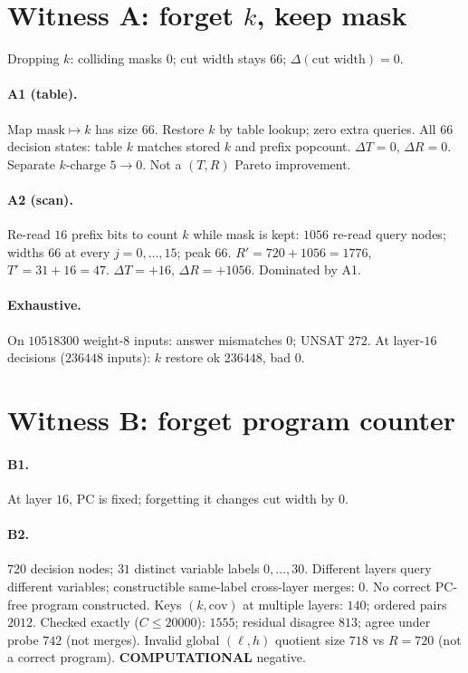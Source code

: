 \documentclass[11pt]{article}
\begin{document}
\section{Witness A: forget \(k\), keep mask}
Dropping \(k\): colliding masks \(0\); cut width stays \(66\); \(\Delta(\text{cut width})=0\).

\paragraph{A1 (table).}
Map \(\mathrm{mask}\mapsto k\) has size \(66\). Restore \(k\) by table lookup; zero extra queries.
All \(66\) decision states: table \(k\) matches stored \(k\) and prefix popcount.
\(\Delta T=0\), \(\Delta R=0\). Separate \(k\)-charge \(5\to 0\). Not a \((T,R)\) Pareto improvement.

\paragraph{A2 (scan).}
Re-read \(16\) prefix bits to count \(k\) while mask is kept: \(1056\) re-read query nodes;
widths \(66\) at every \(j=0,\ldots,15\); peak \(66\).
\(R'=720+1056=1776\), \(T'=31+16=47\). \(\Delta T=+16\), \(\Delta R=+1056\). Dominated by A1.

\paragraph{Exhaustive.}
On \(10518300\) weight-\(8\) inputs: answer mismatches \(0\); UNSAT \(272\).
At layer-\(16\) decisions (\(236448\) inputs): \(k\) restore ok \(236448\), bad \(0\).

\section{Witness B: forget program counter}
\paragraph{B1.} At layer \(16\), PC is fixed; forgetting it changes cut width by \(0\).

\paragraph{B2.} \(720\) decision nodes; \(31\) distinct variable labels \(0,\ldots,30\).
Different layers query different variables; constructible same-label cross-layer merges: \(0\).
No correct PC-free program constructed.
Keys \((k,\mathrm{cov})\) at multiple layers: \(140\); ordered pairs \(2012\).
Checked exactly (\(C\le 20000\)): \(1555\); residual disagree \(813\); agree under probe \(742\) (not merges).
Invalid global \((\ell,h)\) quotient size \(718\) vs \(R=720\) (not a correct program).
\textbf{COMPUTATIONAL} negative.
\end{document}
